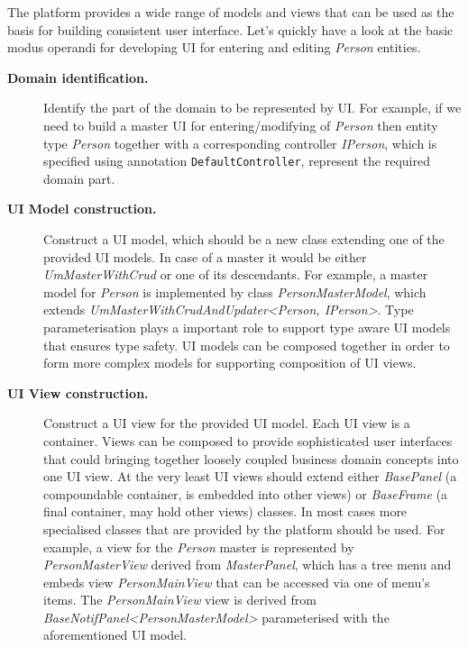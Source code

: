  The platform provides a wide range of models and views that can be used as the basis for building consistent user interface.
  Let's quickly have a look at the basic modus operandi for developing UI for entering and editing \emph{Person} entities.
  \begin{description}
    \item[\textbf{Domain identification.}] Identify the part of the domain to be represented by UI. 
	For example, if we need to build a master UI for entering/modifying of \emph{Person} then entity type \emph{Person} together with a corresponding controller \emph{IPerson}, which is specified using annotation \texttt{DefaultController}, represent the required domain part.
    \item [\textbf{UI Model construction.}] Construct a UI model, which should be a new class extending one of the provided UI models. 
	In case of a master it would be either \emph{UmMasterWithCrud} or one of its descendants. 
	For example, a master model for \emph{Person} is implemented by class \emph{PersonMasterModel}, which extends \emph{UmMasterWithCrudAndUpdater\textless Person, IPerson\textgreater}. 
	Type parameterisation plays a important role to support type aware UI models that ensures type safety.
	UI models can be composed together in order to form more complex models for supporting composition of UI views.
    \item[\textbf{UI View construction.}] Construct a UI view for the provided UI model. 
	Each UI view is a container. 
	Views can be composed to provide sophisticated user interfaces that could bringing together loosely coupled business domain concepts into one UI view.
	At the very least UI views should extend either \emph{BasePanel} (a compoundable container, is embedded into other views) or \emph{BaseFrame} (a final container, may hold other views) classes. 
	In most cases more specialised classes that are provided by the platform should be used.
	For example, a view for the \emph{Person} master is represented by \emph{PersonMasterView} derived from \emph{MasterPanel}, which has a tree menu and embeds view \emph{PersonMainView} that can be accessed via one of menu's items.
	The \emph{PersonMainView} view is derived from \emph{BaseNotifPanel\textless PersonMasterModel\textgreater} parameterised with the aforementioned UI model.
  \end{description}
  
